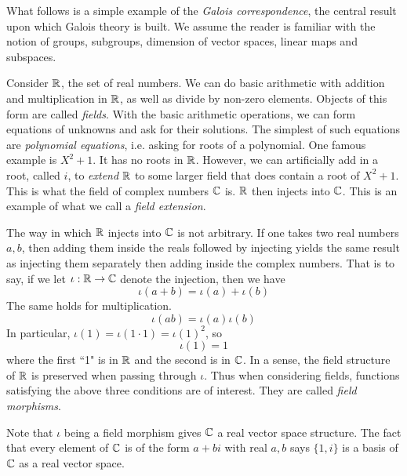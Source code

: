 \documentclass[../book.tex]{subfiles}
\begin{document}

What follows is a simple example of the \emph{Galois correspondence},
the central result upon which Galois theory is built. 
We assume the reader is familiar with the notion of groups, subgroups,
dimension of vector spaces, linear maps and subspaces.

Consider $\mathbb{R}$, the set of real numbers.
We can do basic arithmetic 
with addition and multiplication in $\mathbb{R}$,
as well as divide by non-zero elements. 
Objects of this form are called \emph{fields}.
With the basic arithmetic operations, 
we can form equations of unknowns and ask for their solutions.
The simplest of such equations are \emph{polynomial equations},
i.e. asking for roots of a polynomial. 
One famous example is $X^2 + 1$.
It has no roots in $\mathbb{R}$.
However, we can artificially add in a root, called $i$,
to \emph{extend} $\mathbb{R}$ to some larger field that 
does contain a root of $X^2 + 1$.
This is what the field of complex numbers $\mathbb{C}$ is. 
$\mathbb{R}$ then injects into $\mathbb{C}$.
This is an example of what we call a \emph{field extension}. 

The way in which $\mathbb{R}$ injects into $\mathbb{C}$ is not arbitrary. 
If one takes two real numbers $a, b$, 
then adding them inside the reals followed by injecting yields
the same result as injecting them separately then adding inside the complex numbers.
That is to say, if we let $\iota : \mathbb{R} \to \mathbb{C}$ denote the injection,
then we have \[
    \iota(a + b) = \iota(a) + \iota(b)
\]
The same holds for multiplication. \[
    \iota(a b) = \iota(a)\iota(b)
\]
In particular, $\iota(1) = \iota(1\cdot 1) = \iota(1)^2$,
so \[
    \iota(1) = 1
\]
where the first ``1" is in $\mathbb{R}$ and the second is in $\mathbb{C}$. 
In a sense, the field structure of $\mathbb{R}$ is preserved when passing through $\iota$.
Thus when considering fields, 
functions satisfying the above three conditions are of interest. 
They are called \emph{field morphisms}. 

Note that $\iota$ being a field morphism gives $\mathbb{C}$ a real vector space structure.
The fact that every element of $\mathbb{C}$ is of the form $a + b i$ with real $a, b$
says $\{1,i\}$ is a basis of $\mathbb{C}$ as a real vector space. 
\end{document}
